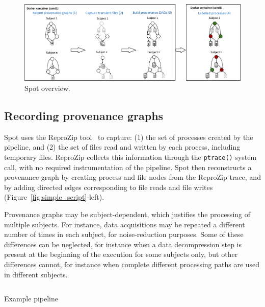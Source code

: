 \documentclass[a4paper,num-refs]{oup-contemporary}
\newcommand{\reprozip}[0]{ReproZip\xspace}
\newcommand{\toolname}[0]{Spot\xspace}
\begin{document}
\begin{figure}
  \centering
    \includegraphics[width=.8\textwidth]{images/spot-diagram}
    \caption{\toolname overview.}
    \label{fig:overview-tool}
  \end{figure}

\subsection{Recording provenance graphs}

\toolname uses the \reprozip tool~\cite{rampin2016reprozip}
to capture: (1) the set of processes created by the
pipeline, and
(2) the set of files read and written by each process, including
temporary files. \reprozip collects this information through the
\texttt{ptrace()} system call, with no required instrumentation of the pipeline.
\toolname then reconstructs a provenance graph by creating process and file
nodes from the \reprozip trace, and by adding directed edges corresponding
to file reads and file writes (Figure~\ref{fig:simple_script}-left).

Provenance graphs may be subject-dependent, which justifies the processing
of multiple subjects. For instance, data acquisitions may be
repeated a different number of times in each subject, for noise-reduction
purposes. Some of these differences can be neglected, for instance when a
data decompression step is present at the beginning of the execution for
some subjects only, but other differences cannot, for instance
when complete different processing paths are used in different subjects. 

\begin{listing}
  \inputminted{bash}{"bin/example.sh"}
  \caption{Example pipeline}
  \label{listing:sample-script}
\end{listing}
\end{document}
